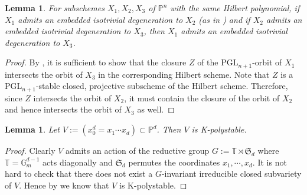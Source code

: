\documentclass[11pt,reqno]{amsart}
\newcommand{\bP}{\mathbb{P}}
\newcommand{\bG}{\mathbb{G}}
\newcommand{\PP}{\mathbb{P}}
\newcommand{\PGL}{\mathrm{PGL}}
\newcommand{\bT}{\mathbb{T}}
\newcommand{\fS}{\mathfrak{S}}
\numberwithin{equation}{section}
\newtheorem{lem}[prop] {Lemma}
\theoremstyle{definition}
\begin{document}
\begin{lem} \label{lem:compositionofisotrivdegn}
    For subschemes $X_1, X_2, X_3$ of $\PP^n$ with the same Hilbert polynomial, if $X_1$ admits an embedded isotrivial degeneration to $X_2 $ (as in ) and if $X_2$ admits an embedded isotrivial degeneration to $X_3$, then $X_1$ admits an embedded isotrivial degeneration to $X_3$.
\end{lem}
\begin{proof}
    By , it is sufficient to show that the closure $Z$ of the $\PGL_{n+1}$-orbit of $X_1$ intersects the orbit of $X_3$ in the corresponding Hilbert scheme. Note that $Z$ is a $\PGL_{n+1}$-stable closed, projective subscheme of the Hilbert scheme. Therefore, since $Z$ intersects the orbit of $X_2$, it must contain the closure of the orbit of $X_2$ and hence intersects the orbit of $X_3$ as well.
\end{proof}
\begin{lem}\label{lem1}
Let $V:= (x_0^d = x_1\cdots x_d)\subset \bP^d$. Then $V$ is K-polystable.
\end{lem}

\begin{proof}
Clearly $V$ admits an action of the reductive group $G:=\bT\rtimes \fS_d$ where $\bT=\bG_m^{d-1}$ acts diagonally and $\fS_d$ permutes the coordinates $x_1,\cdots, x_d$. It is not hard to check that there does not exist a $G$-invariant irreducible closed subvariety of $V$. Hence by \cite{Zhu21} we know that $V$ is K-polystable.
\end{proof}
\end{document}
